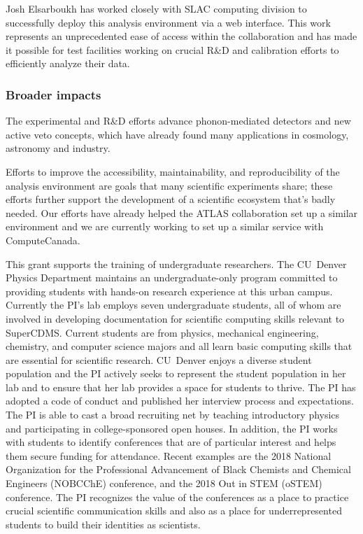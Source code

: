 Josh Elsarboukh has worked closely with SLAC computing division to successfully deploy this analysis environment via a web interface.  This work represents an unprecedented ease of access within the collaboration and has made it possible for test facilities working on crucial R\&D and calibration efforts to efficiently analyze their data.

\subsubsection{Broader impacts}
The \SuperCDMS experimental and R\&D efforts advance phonon-mediated detectors and new active veto concepts, which have already found many applications in cosmology, astronomy and industry. 

Efforts to improve the accessibility, maintainability, and reproducibility of the analysis environment are goals that many scientific experiments share; these efforts further support the development of a scientific ecosystem that's badly needed.  Our efforts have already helped the ATLAS collaboration set up a similar environment and we are currently working to set up a similar service with ComputeCanada.

This grant supports the training of undergraduate researchers.  The CU~Denver Physics Department maintains an undergraduate-only program committed to providing students with hands-on research experience at this urban campus. Currently the PI's lab employs seven undergraduate students, all of whom are involved in developing documentation for scientific computing skills relevant to SuperCDMS.  Current students are from physics, mechanical engineering, chemistry, and computer science majors and all learn basic computing skills that are essential for scientific research.  CU~Denver enjoys a diverse student population and the PI actively seeks to represent the student population in her lab and to ensure that her lab provides a space for students to thrive.  The PI has adopted a code of conduct and published her interview process and expectations.  The PI is able to cast a broad recruiting net by teaching introductory physics and participating in college-sponsored open houses.  In addition, the PI works with students to identify conferences that are of particular interest and helps them secure funding for attendance.  Recent examples are the 2018 National Organization for the Professional Advancement of Black Chemists and Chemical Engineers (NOBCChE) conference, and the 2018 Out in STEM (oSTEM) conference.  The PI recognizes the value of the conferences as a place to practice crucial scientific communication skills and also as a place for underrepresented students to build their identities as scientists.